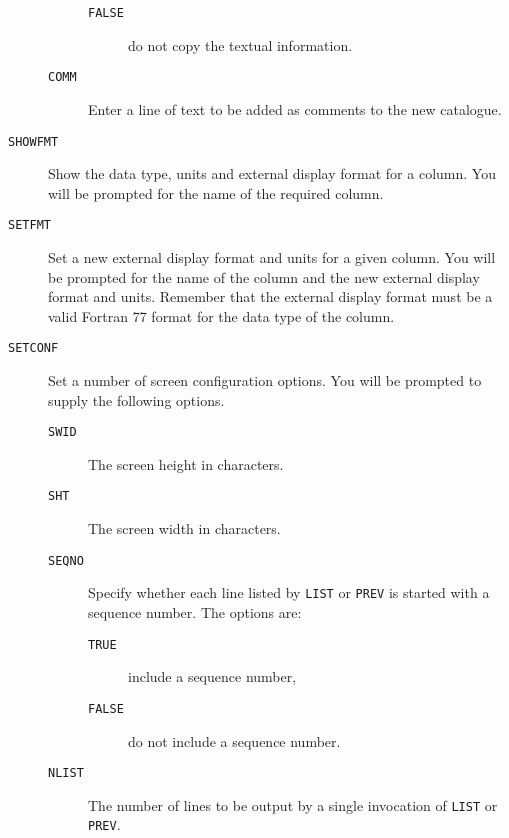 \documentclass[twoside,11pt]{article}
\renewcommand{\_}{\texttt{\symbol{95}}}
\begin{document}
\begin{description}
\begin{description}
\begin{description}
      \item[ {\tt FALSE} ] do not copy the textual information.

    \end{description}

    \item[ {\tt COMM} ] Enter a line of text to be added as comments to
     the new catalogue.

  \end{description}

  \item[ {\tt SHOWFMT} ] Show the data type, units and external display
   format for a column. You will be prompted for the name of the
   required column.

  \item[ {\tt SETFMT} ] Set a new external display format and units
   for a given column. You will be prompted for the name of the
   column and the new external display format and units. Remember that
   the external display format must be a valid Fortran 77 format for
   the data type of the column.

  \item[ {\tt SETCONF} ] Set a number of screen configuration options.
   You will be prompted to supply the following options.

  \begin{description}

    \item[ {\tt SWID} ] The screen height in characters.

    \item[ {\tt SHT} ] The screen width in characters.

    \item[ {\tt SEQNO} ] Specify whether each line listed by
     {\tt LIST} or {\tt PREV} is started with a sequence number.
     The options are:

    \begin{description}

      \item[ {\tt TRUE} ] include a sequence number,

      \item[ {\tt FALSE} ] do not include a sequence number.

    \end{description}

    \item[ {\tt NLIST} ] The number of lines to be output by a single
     invocation of {\tt LIST} or {\tt PREV}.


\end{description}
\end{description}
\end{document}
